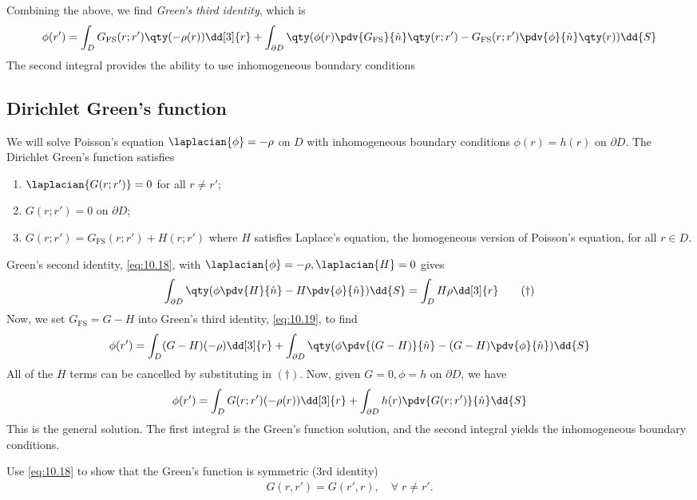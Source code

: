 Combining the above, we find \textit{Green's third identity}, which is
\begin{align} \label{eq:10.19}
	\phi(r') = \int_D G_{\mathrm{FS}}(r;r')  \qty(-\rho(r)) \dd[3]{r} + \int_{\partial D} \qty(\phi(r) \pdv{G_{\mathrm{FS}}}{\hat n} \qty(r;r') - G_{\mathrm{FS}}(r;r') \pdv{\phi}{\hat n}\qty(r)) \dd{S}
\end{align}
The second integral provides the ability to use inhomogeneous boundary conditions

\subsection{Dirichlet Green's function}
We will solve Poisson's equation $\laplacian{\phi} = -\rho$ on $D$ with inhomogeneous boundary conditions $\phi(r) = h(r)$ on $\partial D$.
The Dirichlet Green's function satisfies
\begin{enumerate}
	\item $\laplacian{G(r;r')} = 0$ for all $r \neq r'$;
	\item $G(r;r') = 0$ on $\partial D$;
	\item $G(r;r') = G_{\mathrm{FS}}(r;r') + H(r;r')$ where $H$ satisfies Laplace's equation, the homogeneous version of Poisson's equation, for all $r \in D$.
\end{enumerate}
Green's second identity, \cref{eq:10.18}, with $\laplacian{\phi} = -\rho, \laplacian{H} = 0$ gives
\begin{align*}
	\int_{\partial D} \qty(\phi \pdv{H}{\hat n} - H \pdv{\phi}{\hat n}) \dd{S} = \int_D H \rho \dd[3]{r} \tag{$\dagger$}
\end{align*}
Now, we set $G_{\mathrm{FS}} = G - H$ into Green's third identity, \cref{eq:10.19}, to find
\begin{align*}
	\phi(r') = \int_D (G - H)(-\rho) \dd[3]{r} + \int_{\partial D} \qty(\phi \pdv{(G - H)}{\hat n} - (G-H) \pdv{\phi}{\hat n}) \dd{S}
\end{align*}
All of the $H$ terms can be cancelled by substituting in $(\dagger)$.
Now, given $G = 0, \phi = h$ on $\partial D$, we have
\begin{align} \label{eq:10.20}
	\phi(r') = \int_D G(r;r')(-\rho(r)) \dd[3]{r} + \int_{\partial D} h(r) \pdv{G(r;r')}{\hat n} \dd{S}
\end{align}
This is the general solution.
The first integral is the Green's function solution, and the second integral yields the inhomogeneous boundary conditions.

\begin{exercise}
	Use \cref{eq:10.18} to show that the Green's function is symmetric (3rd identity)
	\begin{align*}
		G(r, r') = G(r', r),\quad \forall \; r \neq r'.
	\end{align*} 
\end{exercise} 

